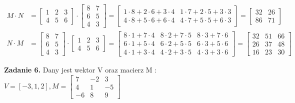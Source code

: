 \documentclass[a4paper]{article}
\begin{document}
\begin{align*}
M \cdot N &=
\left[
\begin{matrix}
1 & 2 & 3 \\ 4 & 5 & 6
\end{matrix}
\right]
\cdot 
\left[
\begin{matrix}
8 & 7 \\ 6 & 5 \\ 4 & 3 
\end{matrix}
\right] = 
\left[ 
\begin{matrix}
1\cdot 8 + 2 \cdot 6 + 3 \cdot 4 & 1 \cdot 7 + 2 \cdot 5 + 3 \cdot 3 \\
4\cdot 8 + 5 \cdot 6 + 6 \cdot 4 & 4 \cdot 7 + 5 \cdot 5 + 6 \cdot 3 
\end{matrix}
\right] = 
\left[
\begin{matrix}
32 & 26 \\ 86 & 71
\end{matrix}
\right]\\
N \cdot M &=
\left[
\begin{matrix}
8 & 7 \\ 6 & 5 \\ 4 & 3 
\end{matrix}
\right] 
\cdot
\left[
\begin{matrix}
1 & 2 & 3 \\ 4 & 5 & 6
\end{matrix}
\right]
= 
\left[ 
\begin{matrix}
8\cdot 1 + 7 \cdot 4 & 8 \cdot 2 + 7 \cdot 5 & 8 \cdot 3 + 7 \cdot 6\\
6\cdot 1 + 5 \cdot 4 & 6 \cdot 2 + 5 \cdot 5 & 6 \cdot 3 + 5 \cdot 6\\
4\cdot 1 + 3 \cdot 4 & 4 \cdot 2 + 3 \cdot 5 & 4 \cdot 3 + 3 \cdot 6
\end{matrix}
\right] = 
\left[
\begin{matrix}
32 & 51 & 66 \\ 
26 & 37 & 48 \\
16 & 23 & 30
\end{matrix}
\right]
\end{align*}

\newpage
\noindent\textbf{Zadanie 6.}
\noindent\textnormal{Dany jest wektor V oraz macierz M :} \\
$V = [-3, 1 ,2] , 
M = \left[\begin{matrix}
7 & -2 & 3 \\
4 & 1  & -5 \\
-6 & 8 & 9
\end{matrix}\right]$\\
\end{document}
